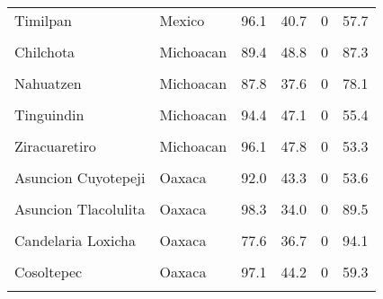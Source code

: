 \documentclass[
]{report}
\begin{document}
\begin{longtable}[t]{llrrrr}
\addlinespace
Timilpan & Mexico & 96.1 & 40.7 & 0 & 57.7\\
\cellcolor{gray!6}{Charapan} & \cellcolor{gray!6}{Michoacan} & \cellcolor{gray!6}{83.6} & \cellcolor{gray!6}{46.2} & \cellcolor{gray!6}{0} & \cellcolor{gray!6}{95.3}\\
Chilchota & Michoacan & 89.4 & 48.8 & 0 & 87.3\\
\cellcolor{gray!6}{Erongaricuaro} & \cellcolor{gray!6}{Michoacan} & \cellcolor{gray!6}{94.3} & \cellcolor{gray!6}{46.7} & \cellcolor{gray!6}{0} & \cellcolor{gray!6}{79.4}\\
Nahuatzen & Michoacan & 87.8 & 37.6 & 0 & 78.1\\
\addlinespace
\cellcolor{gray!6}{Tingambato} & \cellcolor{gray!6}{Michoacan} & \cellcolor{gray!6}{96.0} & \cellcolor{gray!6}{45.4} & \cellcolor{gray!6}{0} & \cellcolor{gray!6}{87.3}\\
Tinguindin & Michoacan & 94.4 & 47.1 & 0 & 55.4\\
\cellcolor{gray!6}{Tzintzuntzan} & \cellcolor{gray!6}{Michoacan} & \cellcolor{gray!6}{95.0} & \cellcolor{gray!6}{46.7} & \cellcolor{gray!6}{0} & \cellcolor{gray!6}{82.0}\\
Ziracuaretiro & Michoacan & 96.1 & 47.8 & 0 & 53.3\\
\cellcolor{gray!6}{Asuncion Cacalotepec} & \cellcolor{gray!6}{Oaxaca} & \cellcolor{gray!6}{87.6} & \cellcolor{gray!6}{37.2} & \cellcolor{gray!6}{0} & \cellcolor{gray!6}{100.0}\\
\addlinespace
Asuncion Cuyotepeji & Oaxaca & 92.0 & 43.3 & 0 & 53.6\\
\cellcolor{gray!6}{Asuncion Ocotlan} & \cellcolor{gray!6}{Oaxaca} & \cellcolor{gray!6}{87.0} & \cellcolor{gray!6}{44.9} & \cellcolor{gray!6}{0} & \cellcolor{gray!6}{94.7}\\
Asuncion Tlacolulita & Oaxaca & 98.3 & 34.0 & 0 & 89.5\\
\cellcolor{gray!6}{Ayotzintepec} & \cellcolor{gray!6}{Oaxaca} & \cellcolor{gray!6}{91.3} & \cellcolor{gray!6}{31.1} & \cellcolor{gray!6}{0} & \cellcolor{gray!6}{91.8}\\
Candelaria Loxicha & Oaxaca & 77.6 & 36.7 & 0 & 94.1\\
\addlinespace
\cellcolor{gray!6}{Concepcion Papalo} & \cellcolor{gray!6}{Oaxaca} & \cellcolor{gray!6}{88.4} & \cellcolor{gray!6}{40.1} & \cellcolor{gray!6}{0} & \cellcolor{gray!6}{86.9}\\
Cosoltepec & Oaxaca & 97.1 & 44.2 & 0 & 59.3\\
\cellcolor{gray!6}{Cuyamecalco Villa de Zaragoza} & \cellcolor{gray!6}{Oaxaca} & \cellcolor{gray!6}{75.6} & \cellcolor{gray!6}{37.3} & \cellcolor{gray!6}{0} & \cellcolor{gray!6}{78.4}\\

\end{longtable}
\end{document}
